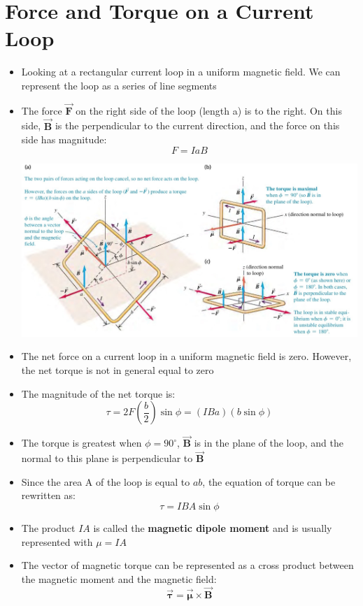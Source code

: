\documentclass[11pt, a4paper]{article}
\begin{document}
\section[27.7, Force and Torque on a Current Loop]{Force and Torque on a Current Loop}
\begin{itemize}
    \item Looking at a rectangular current loop in a uniform magnetic field. We can
        represent the loop as a series of line segments
    \item The force $\vec{\mathbf{F}}$ on the right side of the loop (length a) is to the
        right. On this side, $\vec{\mathbf{B}}$ is the perpendicular to the current
        direction, and the force on this side has magnitude:
        \begin{equation}
            F = IaB
        \end{equation}

        \includegraphics[scale=0.65]{images/square_current_loop.jpg}

    \item The net force on a current loop in a uniform magnetic field is zero. However,
        the net torque is not in general equal to zero
    \item The magnitude of the net torque is:
        \begin{equation}
            \tau = 2F(\frac{b}{2})\sin\phi = (IBa)(b\sin\phi)
        \end{equation}
    \item The torque is greatest when $\phi = 90^{\circ}$, $\vec{\mathbf{B}}$ is in the
        plane of the loop, and the normal to this plane is perpendicular to
        $\vec{\mathbf{B}}$
    \item Since the area A of the loop is equal to $ab$, the equation of torque can be
        rewritten as:
        \begin{equation}
            \tau = IBA\sin\phi
        \end{equation}
    \item The product $IA$ is called the \textbf{magnetic dipole moment} and is usually
        represented with $\mu = IA$
    \item The vector of magnetic torque can be represented as a cross product between the
        magnetic moment and the magnetic field:
        \begin{equation}
            \vec{\mathbf{\tau}} = \vec{\mathbf{\mu}} \times \vec{\mathbf{B}}
        \end{equation}
\end{itemize}
\end{document}
